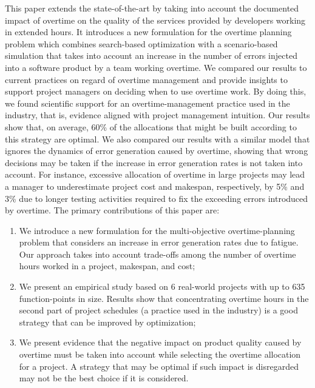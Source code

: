 \documentclass[conference]{IEEEtran}
\begin{document}
This paper extends the state-of-the-art by taking into account the documented impact of overtime on the quality of the services provided by developers working in extended hours. It introduces a new formulation for the overtime planning problem which combines search-based optimization with a scenario-based simulation that takes into account an increase in the number of errors injected into a software product by a team working overtime. We compared our results to current practices on regard of overtime management and provide insights to support project managers on deciding when to use overtime work. By doing this, we found scientific support for an overtime-management practice used in the industry, that is, evidence aligned with project management intuition. Our results show that, on average, 60\% of the allocations that might be built according to this strategy are optimal. We also compared our results with a similar model that ignores the dynamics of error generation caused by overtime,  showing that wrong decisions may be taken if the increase in error generation rates is not taken into account. For instance, excessive allocation of overtime in large projects may lead a manager to underestimate project cost and makespan, respectively, by 5\% and 3\% due to longer testing activities required to fix the exceeding errors introduced by overtime. The primary contributions of this paper are:

\begin{enumerate}
\item We introduce a new formulation for the multi-objective overtime-planning problem that considers an increase in error generation rates due to fatigue. Our approach takes into account trade-offs among the number of overtime hours worked in a project, makespan, and cost;

\item We present an empirical study based on 6 real-world projects with up to 635 function-points in size. Results show that concentrating overtime hours in the second part of project schedules (a practice used in the industry) is a good strategy that can be improved by optimization;

\item We present evidence that the negative impact on product quality caused by overtime must be taken into account while selecting the overtime allocation for a project. A strategy that may be optimal if such impact is disregarded may not be the best choice if it is considered.
\end{enumerate}
\end{document}
